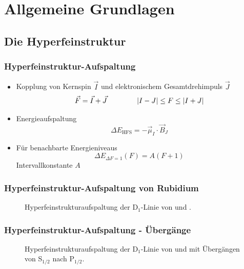 
\section{Allgemeine Grundlagen}

\subsection{Die Hyperfeinstruktur}

\begin{frame}
\frametitle{Hyperfeinstruktur-Aufspaltung}
\begin{itemize}
    \item<1-> Kopplung von Kernspin $\vec{I}$ und elektronischem Gesamtdrehimpuls $\vec{J}$
    \begin{equation*}
        \vec{F} = \vec{I} + \vec{J} \qquad \qquad \left|I - J\right| \leq F \leq \left|I + J\right|
    \end{equation*}
    \item<2-> Energieaufspaltung
    \begin{equation*}
        \Delta E_\text{HFS} = - \vec{\mu}_I \cdot \vec{B}_J
    \end{equation*}
    \item<3-> Für benachbarte Energieniveaus
    \begin{equation*}
        \Delta E_{\Delta F = 1} (F) = A(F+1)
    \end{equation*}
    Intervallkonstante $A$
\end{itemize}
\end{frame}


\begin{frame}
\frametitle{Hyperfeinstruktur-Aufspaltung von Rubidium}

\begin{figure}
    \centering
    \def\svgwidth{\textwidth}
    
    \caption{Hyperfeinstrukturaufspaltung der D$_1$-Linie von  und .}
\end{figure}
\end{frame}


\begin{frame}
\frametitle{Hyperfeinstruktur-Aufspaltung - Übergänge}

\begin{figure}
    \centering
    \def\svgwidth{\textwidth}
    
    \caption{Hyperfeinstrukturaufspaltung der D$_1$-Linie von 
     und  mit Übergängen von S$_{1/2}$ nach P$_{1/2}.$}
\end{figure}
\end{frame}


